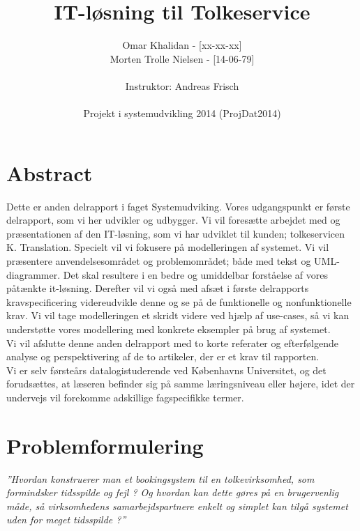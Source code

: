 \documentclass[12pt]{article}
\title{IT-løsning til Tolkeservice}
\author{Omar Khalidan - [xx-xx-xx]\\
     Morten Trolle Nielsen - [14-06-79]\\ \\
    Instruktor: Andreas Frisch\\ \\
Projekt i systemudvikling 2014 (ProjDat2014)}
\begin{document}
\maketitle
\thispagestyle{empty}
\newpage
\tableofcontents
\newpage

\section{Abstract}
Dette er anden delrapport i faget Systemudviking. Vores udgangspunkt er første
delrapport, som vi her udvikler og udbygger. Vi vil foresætte arbejdet med og
præsentationen af den IT-løsning, som vi har udviklet til kunden; tolkeservicen
K. Translation. Specielt vil vi fokusere på modelleringen af systemet. Vi vil 
præsentere anvendelsesområdet og problemområdet; både med tekst og UML-diagrammer.
Det skal resultere i en bedre og umiddelbar forståelse af vores påtænkte it-løsning.
Derefter vil vi også med afsæt i første delrapports kravspecificering videreudvikle
denne og se på de funktionelle og nonfunktionelle krav. Vi vil tage modelleringen
et skridt videre ved hjælp af use-cases, så vi kan understøtte vores modellering med
konkrete eksempler på brug af systemet. \\
Vi vil afslutte denne anden delrapport med to korte referater og efterfølgende
analyse og perspektivering af de to artikeler, der er et krav til rapporten.\\
Vi er selv førsteårs datalogistuderende ved Københavns Universitet, og det
forudsættes, at læseren befinder sig på samme læringsniveau eller højere, idet
der undervejs vil forekomme adskillige fagspecifikke termer. 

\newpage

\section{Problemformulering}

\emph{”Hvordan konstruerer man et bookingsystem til en tolkevirksomhed, som
formindsker tidsspilde og fejl ? Og hvordan kan dette gøres på en brugervenlig
måde, så virksomhedens samarbejdspartnere enkelt og simplet kan tilgå systemet 
uden for meget tidsspilde ?”}\\
\end{document}
